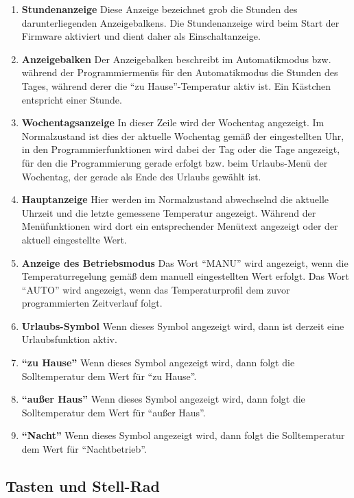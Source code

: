 \documentclass[a4paper]{article}
\begin{document}
\begin{enumerate}
\item \textbf{Stundenanzeige} Diese Anzeige bezeichnet grob die
  Stunden des darunterliegenden Anzeigebalkens.  Die Stundenanzeige
  wird beim Start der Firmware aktiviert und dient daher als
  Einschaltanzeige.
\item \textbf{Anzeigebalken} Der Anzeigebalken beschreibt im
  Automatikmodus bzw. während der Programmiermenüs für den
  Automatikmodus die Stunden des Tages, während derer die "`zu
  Hause"'-Temperatur aktiv ist.  Ein Kästchen entspricht einer Stunde.
\item \textbf{Wochentagsanzeige} In dieser Zeile wird der Wochentag
  angezeigt.  Im Normalzustand ist dies der aktuelle Wochentag gemäß
  der eingestellten Uhr, in den Programmierfunktionen wird dabei der
  Tag oder die Tage angezeigt, für den die Programmierung gerade
  erfolgt bzw. beim Urlaubs-Menü der Wochentag, der gerade als Ende
  des Urlaubs gewählt ist.
\item \textbf{Hauptanzeige} Hier werden im Normalzustand abwechselnd
  die aktuelle Uhrzeit und die letzte gemessene Temperatur angezeigt.
  Während der Menüfunktionen wird dort ein entsprechender Menütext
  angezeigt oder der aktuell eingestellte Wert.
\item \textbf{Anzeige des Betriebsmodus} Das Wort "`MANU"' wird
  angezeigt, wenn die Temperaturregelung gemäß dem manuell eingestellten
  Wert erfolgt.  Das Wort "`AUTO"' wird angezeigt, wenn das
  Temperaturprofil dem zuvor programmierten Zeitverlauf folgt.
\item \textbf{Urlaubs-Symbol} Wenn dieses Symbol angezeigt wird, dann
  ist derzeit eine Urlaubsfunktion aktiv.
\item \textbf{"`zu Hause"'} Wenn dieses Symbol angezeigt wird, dann
  folgt die Solltemperatur dem Wert für "`zu Hause"'.
\item \textbf{"`außer Haus"'} Wenn dieses Symbol angezeigt wird, dann
  folgt die Solltemperatur dem Wert für "`außer Haus"'.
\item \textbf{"`Nacht"'} Wenn dieses Symbol angezeigt wird, dann folgt
  die Solltemperatur dem Wert für "`Nachtbetrieb"'.

\end{enumerate}

\subsection {
  Tasten und Stell-Rad
}
\end{document}
